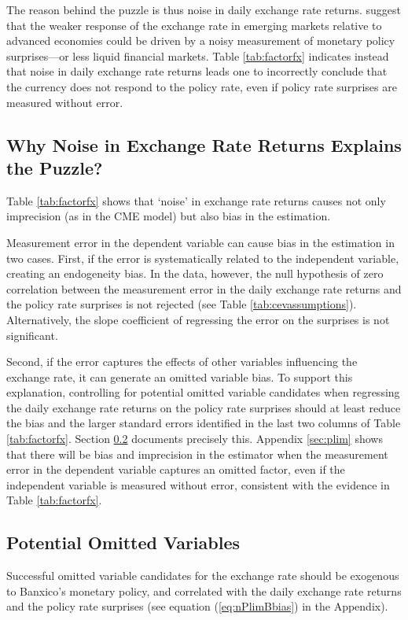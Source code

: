 \documentclass[a4paper,12pt]{article} 		%
\newcommand{\sectitlespace}{\vspace{0.1in}}
\begin{document}
The reason behind the puzzle is thus noise in daily exchange rate returns. \textcite{PenningsRamayandiTang:2015} suggest that the weaker response of the exchange rate in emerging markets relative to advanced economies could be driven by a noisy measurement of monetary policy surprises---or less liquid financial markets. Table \ref{tab:factorfx} indicates instead that noise in daily exchange rate returns leads one to incorrectly conclude that the currency does not respond to the policy rate, even if policy rate surprises are measured without error. 

\sectitlespace
\subsection{Why Noise in Exchange Rate Returns Explains the Puzzle?}
\sectitlespace
Table \ref{tab:factorfx} shows that `noise’ in exchange rate returns causes not only imprecision (as in the CME model) but also bias in the estimation. 

Measurement error in the dependent variable can cause bias in the estimation in two cases. First, if the error is systematically related to the independent variable, creating an endogeneity bias. In the data, however, the null hypothesis of zero correlation between the measurement error in the daily exchange rate returns and the policy rate surprises is not rejected (see Table \ref{tab:cevassumptions}). Alternatively, the slope coefficient of regressing the error on the surprises is not significant. 

Second, if the error captures the effects of other variables influencing the exchange rate, it can generate an omitted variable bias. To support this explanation, controlling for potential omitted variable candidates when regressing the daily exchange rate returns on the policy rate surprises should at least reduce the bias and the larger standard errors identified in the last two columns of Table \ref{tab:factorfx}. Section \ref{sec:omittedvar} documents precisely this. 
Appendix \ref{sec:plim} shows that there will be bias and imprecision in the estimator when the measurement error in the dependent variable captures an omitted factor, even if the independent variable is measured without error, consistent with the evidence in Table \ref{tab:factorfx}.

\sectitlespace
\subsection{Potential Omitted Variables} \label{sec:omittedvar}
\sectitlespace
Successful omitted variable candidates for the exchange rate should be exogenous to Banxico's monetary policy, and correlated with the daily exchange rate returns and the policy rate surprises (see equation (\ref{eq:nPlimBbias}) in the Appendix). 
\end{document}
